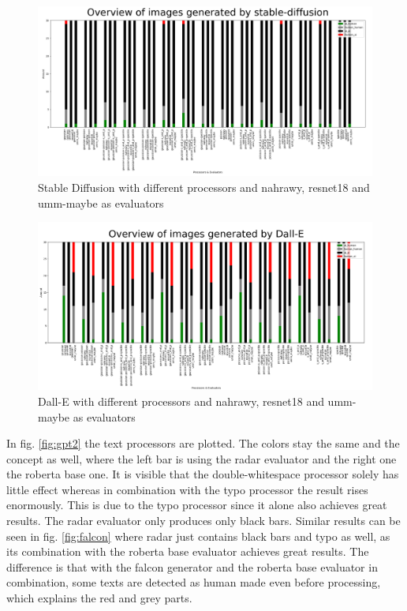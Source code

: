 \documentclass{article} %
\begin{document}
\begin{figure}
	\centering
	\includegraphics[width=\linewidth]{images/stable-diffusion.png}
	\caption{Stable Diffusion with different processors and nahrawy, resnet18 and umm-maybe as evaluators}
	\label{fig:stable_diffusion}
\end{figure}

\begin{figure}
	\centering
	\includegraphics[width=\linewidth]{images/dalle.png}
	\caption{Dall-E with different processors and nahrawy, resnet18 and umm-maybe as evaluators}
	\label{fig:dallE}
\end{figure}


In fig. \ref{fig:gpt2} the text processors are plotted. The colors stay the same and the concept as well, where the left bar is using the radar evaluator and the right one the roberta base one. It is visible that the double-whitespace processor solely has little effect whereas in combination with the typo processor the result rises enormously. This is due to the typo processor since it alone also achieves great results. The radar evaluator only produces only black bars. 
Similar results can be seen in fig. \ref{fig:falcon} where radar just contains black bars and typo as well, as its combination with the roberta base evaluator achieves great results. The difference is that with the falcon generator and the roberta base evaluator in combination, some texts are detected as human made even before processing, which explains the red and grey parts. 
\end{document}
